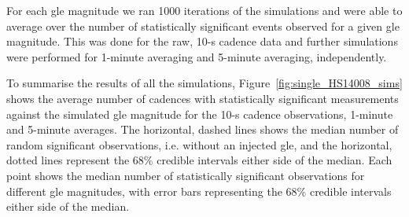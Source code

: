 For each \gls{gle} magnitude we ran 1000 iterations of the simulations and were able to average over the number of statistically significant events observed for a given \gls{gle} magnitude. This was done for the raw, 10-s cadence data and further simulations were performed for 1-minute averaging and 5-minute averaging, independently.

To summarise the results of all the simulations, Figure~\ref{fig:single_HS14008_sims} shows the average number of cadences with statistically significant measurements against the simulated \gls{gle} magnitude for the 10-s cadence observations, 1-minute and 5-minute averages. The horizontal, dashed lines shows the median number of random significant observations, i.e. without an injected \gls{gle}, and the horizontal, dotted lines represent the $68 \%$ credible intervals either side of the median. Each point shows the median number of statistically significant observations for different \gls{gle} magnitudes, with error bars representing the $68 \%$ credible intervals either side of the median.


